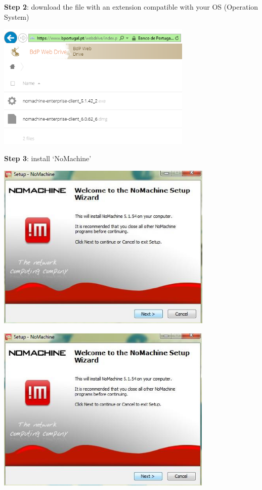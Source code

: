 \documentclass[
  11pt,
  a4paper,
]{article}
\begin{document}
\textbf{Step 2}: download the file with an extension compatible with
your OS (Operation System)

\includegraphics[width=3.6682in,height=2.3622in]{./media/image18.png}

\textbf{Step 3}: install `NoMachine'

\includegraphics[width=4.07941in,height=3.14961in]{./media/image19.png}

\includegraphics[width=4.06859in,height=3.14961in]{./media/image20.png}
\end{document}
